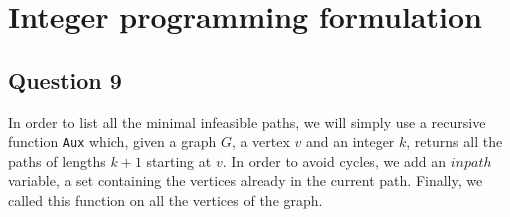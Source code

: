 \documentclass[english]{article}
\begin{document}
\section{Integer programming formulation}

\subsection*{Question 9}

    


    
    

    

In order to list all the minimal infeasible paths, we will simply use a recursive function \texttt{Aux} which, given a graph $G$, a vertex $v$ and an integer $k$, returns all the paths of lengths $k+1$ starting at $v$. In order to avoid cycles, we add an $inpath$ variable, a set containing the vertices already in the current path. Finally, we called this function on all the vertices of the graph.
\end{document}

